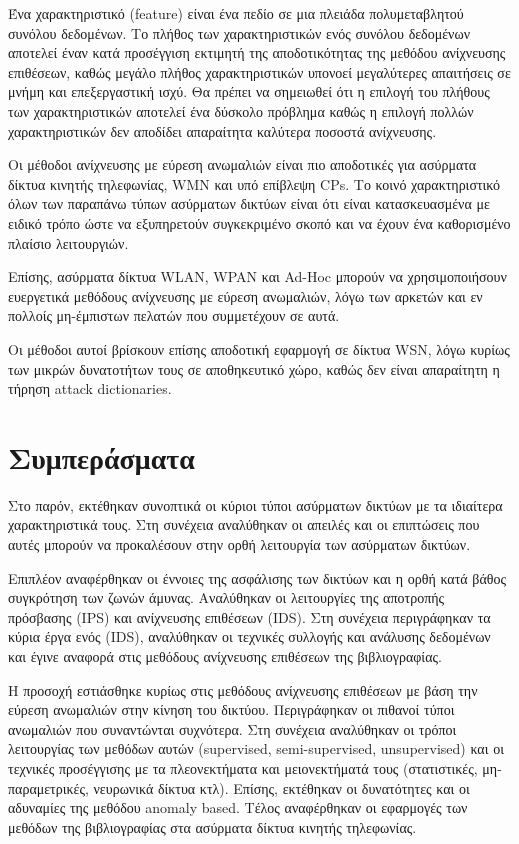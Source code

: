\documentclass[12pt]{report}
\begin{document}
Ένα χαρακτηριστικό (\textlatin{feature}) είναι ένα πεδίο σε μια πλειάδα πολυμεταβλητού συνόλου δεδομένων. Το πλήθος των χαρακτηριστικών ενός συνόλου δεδομένων αποτελεί έναν κατά προσέγγιση εκτιμητή της αποδοτικότητας της μεθόδου ανίχνευσης επιθέσεων, καθώς μεγάλο πλήθος χαρακτηριστικών υπονοεί μεγαλύτερες απαιτήσεις σε μνήμη και επεξεργαστική ισχύ. Θα πρέπει να σημειωθεί ότι η επιλογή του πλήθους των χαρακτηριστικών αποτελεί ένα δύσκολο πρόβλημα καθώς η επιλογή πολλών χαρακτηριστικών δεν αποδίδει απαραίτητα καλύτερα ποσοστά ανίχνευσης. 

Οι μέθοδοι ανίχνευσης με εύρεση ανωμαλιών είναι πιο αποδοτικές για ασύρματα δίκτυα κινητής τηλεφωνίας, \textlatin{WMN} και υπό επίβλεψη \textlatin{CPs}. Το κοινό χαρακτηριστικό όλων των παραπάνω τύπων ασύρματων δικτύων είναι ότι είναι κατασκευασμένα με ειδικό τρόπο ώστε να εξυπηρετούν συγκεκριμένο σκοπό και να έχουν ένα καθορισμένο πλαίσιο λειτουργιών.

Επίσης, ασύρματα δίκτυα \textlatin{WLAN, WPAN} και \textlatin{Ad-Hoc} μπορούν να χρησιμοποιήσουν ευεργετικά μεθόδους ανίχνευσης με εύρεση ανωμαλιών, λόγω των αρκετών και εν πολλοίς μη-έμπιστων πελατών που συμμετέχουν σε αυτά.

Οι μέθοδοι αυτοί βρίσκουν επίσης αποδοτική εφαρμογή σε δίκτυα \textlatin{WSN}, λόγω κυρίως των μικρών δυνατοτήτων τους σε αποθηκευτικό χώρο, καθώς δεν είναι απαραίτητη η τήρηση \textlatin{attack dictionaries}.

\chapter{Συμπεράσματα}
Στο παρόν, εκτέθηκαν συνοπτικά οι κύριοι τύποι ασύρματων δικτύων με τα ιδιαίτερα χαρακτηριστικά τους. Στη συνέχεια αναλύθηκαν οι απειλές και οι επιπτώσεις που αυτές μπορούν να προκαλέσουν στην ορθή λειτουργία των ασύρματων δικτύων.

Επιπλέον αναφέρθηκαν οι έννοιες της ασφάλισης των δικτύων και η ορθή κατά βάθος συγκρότηση των ζωνών άμυνας. Αναλύθηκαν οι λειτουργίες της αποτροπής πρόσβασης (\textlatin{IPS}) και ανίχνευσης επιθέσεων (\textlatin{IDS}). Στη συνέχεια περιγράφηκαν τα κύρια έργα ενός (\textlatin{IDS}), αναλύθηκαν οι τεχνικές συλλογής και ανάλυσης δεδομένων και έγινε αναφορά στις μεθόδους ανίχνευσης επιθέσεων της βιβλιογραφίας.

Η προσοχή εστιάσθηκε κυρίως στις μεθόδους ανίχνευσης επιθέσεων με βάση την εύρεση ανωμαλιών στην κίνηση του δικτύου. Περιγράφηκαν οι πιθανοί τύποι ανωμαλιών που συναντώνται συχνότερα. Στη συνέχεια αναλύθηκαν οι  τρόποι λειτουργίας των μεθόδων αυτών (\textlatin{supervised, semi-supervised, unsupervised}) και οι τεχνικές προσέγγισης με τα πλεονεκτήματα και μειονεκτήματά τους (στατιστικές, μη-παραμετρικές, νευρωνικά δίκτυα κτλ). Επίσης, εκτέθηκαν οι δυνατότητες και οι αδυναμίες της μεθόδου \textlatin{anomaly based}. Τέλος αναφέρθηκαν οι εφαρμογές των μεθόδων της βιβλιογραφίας στα ασύρματα δίκτυα κινητής τηλεφωνίας.

\listoffigures


\end{document}
